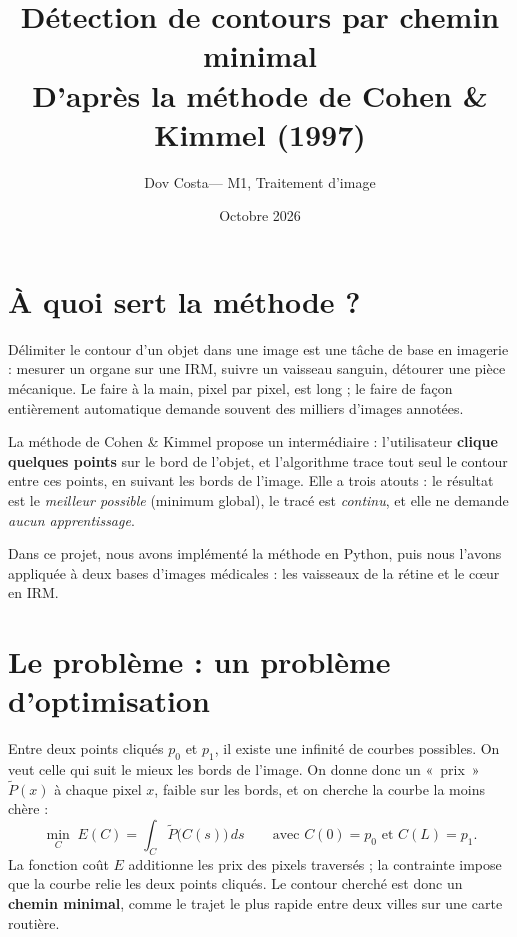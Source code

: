 \documentclass[11pt,a4paper]{article}
\title{\textbf{Détection de contours par chemin minimal}\\[0.3em]
\large D'après la méthode de Cohen \& Kimmel (1997)}
\author{Dov Costa--- M1, Traitement d'image}
\date{Octobre 2026}
\newcommand{\og}{«~}
\newcommand{\fg}{~»}
\begin{document}
\maketitle
\vspace{-1.5em}

\section{À quoi sert la méthode ?}

Délimiter le contour d'un objet dans une image est une tâche de base en imagerie : mesurer un organe sur
une IRM, suivre un vaisseau sanguin, détourer une pièce mécanique. Le faire à la main, pixel par pixel, est
long ; le faire de façon entièrement automatique demande souvent des milliers d'images annotées.

La méthode de Cohen \& Kimmel \cite{cohen97} propose un intermédiaire : l'utilisateur \textbf{clique
quelques points} sur le bord de l'objet, et l'algorithme trace tout seul le contour entre ces points, en
suivant les bords de l'image. Elle a trois atouts : le résultat est le \emph{meilleur possible} (minimum
global), le tracé est \emph{continu}, et elle ne demande \emph{aucun apprentissage}.

Dans ce projet, nous avons implémenté la méthode en Python, puis nous l'avons appliquée à deux bases
d'images médicales : les vaisseaux de la rétine et le cœur en IRM.

\section{Le problème : un problème d'optimisation}

Entre deux points cliqués $p_0$ et $p_1$, il existe une infinité de courbes possibles. On veut celle qui
suit le mieux les bords de l'image. On donne donc un \og prix\fg{} $\tilde P(x)$ à chaque pixel $x$, faible
sur les bords, et on cherche la courbe la moins chère :
\begin{equation}
  \min_{C} \; E(C) = \int_C \tilde P\big(C(s)\big)\, ds
  \qquad \text{avec } C(0) = p_0 \text{ et } C(L) = p_1 .
\end{equation}
La fonction coût $E$ additionne les prix des pixels traversés ; la contrainte impose que la courbe relie les
deux points cliqués. Le contour cherché est donc un \textbf{chemin minimal}, comme le trajet le plus rapide
entre deux villes sur une carte routière.
\end{document}
